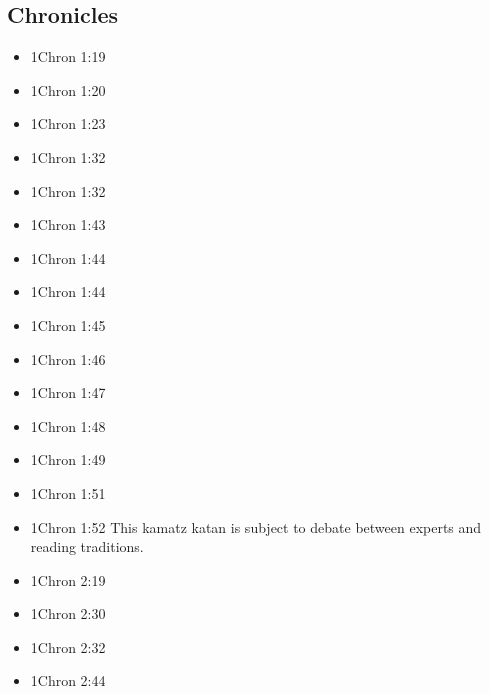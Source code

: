 \documentclass[14pt]{book}
\begin{document}
\subsection{Chronicles}
\begin{multicols}{2}\begin{itemize}
		\item 1Chron 1:19
		
		\item 1Chron 1:20
		
		\item 1Chron 1:23
		
		\item 1Chron 1:32
		
		\item 1Chron 1:32
		
		\item 1Chron 1:43
		
		\item 1Chron 1:44
		
		\item 1Chron 1:44
		
		\item 1Chron 1:45
		
		\item 1Chron 1:46
		
		\item 1Chron 1:47
		
		\item 1Chron 1:48
		
		\item 1Chron 1:49
		
		\item 1Chron 1:51
		
		\item 1Chron 1:52 This kamatz katan is subject to debate between experts and reading traditions.
		
		\item 1Chron 2:19
		
		\item 1Chron 2:30
		
		\item 1Chron 2:32
		
		\item 1Chron 2:44
				

\end{itemize}
\end{multicols}
\end{document}
